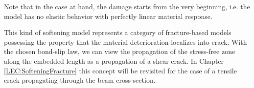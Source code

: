 \documentclass[main.tex]{subfiles}
\begin{document}
Note that in the case at hand, the damage starts from the very beginning, i.e. the model has no elastic behavior with perfectly linear material response.

This kind of softening model represents a category of fracture-based models possessing the property that the material deterioration localizes into crack. With the chosen bond-slip law, we can view the propagation of the stress-free zone along the embedded length as a propagation of a shear crack. In Chapter \ref{LEC:SofteningFracture} this concept will be revisited for the case of a tensile crack propagating through the beam cross-section.


\end{document}
